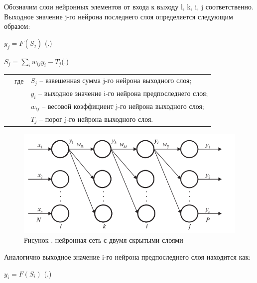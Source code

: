 	\par \redline Обозначим слои нейронных элементов от входа к выходу l, k, i, j соответственно. Выходное значение j-го нейрона последнего слоя определяется следующим образом:
	
	\formulaspace \par \redline 
	$y_{j} = F(S_{j}) $
	\hfill (\thechaptercntr .\theformulacntr) \redline
	\formulaspace \addtocounter{formulacntr}{1}
	
	\formulaspace \par \redline 
	$S_{j} = \sum \limits _{i}^{} w_{ij}y_{i} - T_{j}$\hfill (\thechaptercntr .\theformulacntr) \redline
	\formulaspace \addtocounter{formulacntr}{1}
	
	\begin{tabular}{p{}p{}p{}}
		& где  & $S_{j}$ {--} взвешенная сумма j-го нейрона выходного слоя; \\
		&      & $y_{i}$ {--} выходное значение i-го нейрона предпоследнего слоя; \\
		&      & $w_{ij}$ {--} весовой коэффициент j-го нейрона выходного слоя; \\
		&      & $T_{j}$ {--} порог j-го нейрона выходного слоя. \\
	\end{tabular}
	
	\begin{figure}[H]
		\centering
		\def\svgwidth{\textwidth}
		\includegraphics[scale=1.2]{images/bpe_perceptron.png}
		\caption*{\gostFont Рисунок \thechaptercntr .\theimagecntr \spc {--} нейронная сеть с двумя скрытыми слоями}
	\end{figure}  \addtocounter{imagecntr}{1}
	
	
	\par \redline Аналогично выходное значение i-го нейрона предпоследнего слоя находится как:
	
		\formulaspace \par \redline 
	$y_{i} = F(S_{i}) $
	\hfill (\thechaptercntr .\theformulacntr) \redline
	\formulaspace \addtocounter{formulacntr}{1}
	
